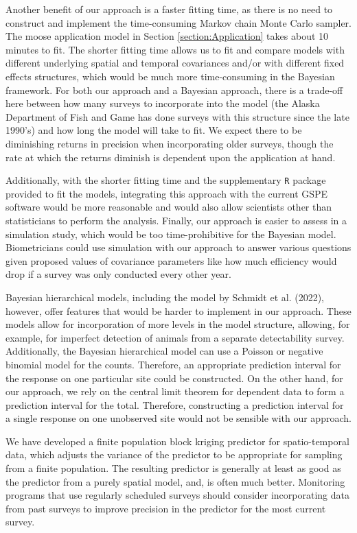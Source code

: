 \documentclass[]{article}    %
\begin{document}
Another benefit of our approach is a faster fitting time, as there is no
need to construct and implement the time-consuming Markov chain Monte
Carlo sampler. The moose application model in Section
\ref{section:Application} takes about 10 minutes to fit. The shorter
fitting time allows us to fit and compare models with different
underlying spatial and temporal covariances and/or with different fixed
effects structures, which would be much more time-consuming in the
Bayesian framework. For both our approach and a Bayesian approach, there
is a trade-off here between how many surveys to incorporate into the
model (the Alaska Department of Fish and Game has done surveys with this
structure since the late 1990's) and how long the model will take to
fit. We expect there to be diminishing returns in precision when
incorporating older surveys, though the rate at which the returns
diminish is dependent upon the application at hand.

Additionally, with the shorter fitting time and the supplementary
\texttt{R} package provided to fit the models, integrating this approach
with the current GSPE software would be more reasonable and would also
allow scientists other than statisticians to perform the analysis.
Finally, our approach is easier to assess in a simulation study, which
would be too time-prohibitive for the Bayesian model. Biometricians
could use simulation with our approach to answer various questions given
proposed values of covariance parameters like how much efficiency would
drop if a survey was only conducted every other year.

Bayesian hierarchical models, including the model by Schmidt et al.
(2022), however, offer features that would be harder to implement in our
approach. These models allow for incorporation of more levels in the
model structure, allowing, for example, for imperfect detection of
animals from a separate detectability survey. Additionally, the Bayesian
hierarchical model can use a Poisson or negative binomial model for the
counts. Therefore, an appropriate prediction interval for the response
on one particular site could be constructed. On the other hand, for our
approach, we rely on the central limit theorem for dependent data to
form a prediction interval for the total. Therefore, constructing a
prediction interval for a single response on one unobserved site would
not be sensible with our approach.

We have developed a finite population block kriging predictor for
spatio-temporal data, which adjusts the variance of the predictor to be
appropriate for sampling from a finite population. The resulting
predictor is generally at least as good as the predictor from a purely
spatial model, and, is often much better. Monitoring programs that use
regularly scheduled surveys should consider incorporating data from past
surveys to improve precision in the predictor for the most current
survey.
\end{document}
